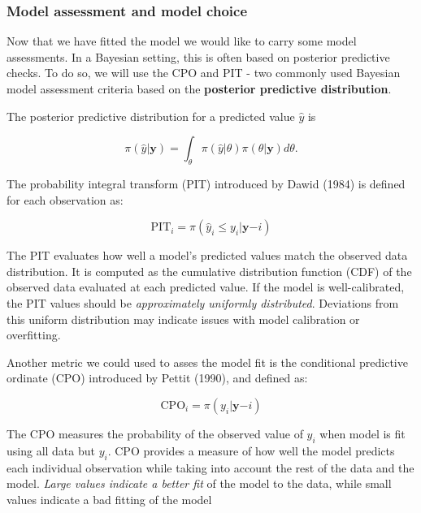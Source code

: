 \documentclass[
  letterpaper,
  DIV=11,
  numbers=noendperiod]{scrartcl}
\begin{document}
\subsubsection{Model assessment and model
choice}\label{model-assessment-and-model-choice}

Now that we have fitted the model we would like to carry some model
assessments. In a Bayesian setting, this is often based on posterior
predictive checks. To do so, we will use the CPO and PIT - two commonly
used Bayesian model assessment criteria based on the \textbf{posterior
predictive distribution}.

\begin{tcolorbox}[enhanced jigsaw, coltitle=black, breakable, colbacktitle=quarto-callout-note-color!10!white, bottomtitle=1mm, toprule=.15mm, colframe=quarto-callout-note-color-frame, rightrule=.15mm, title=\textcolor{quarto-callout-note-color}{\faInfo}\hspace{0.5em}{Posterior predictive model checking}, arc=.35mm, toptitle=1mm, opacityback=0, titlerule=0mm, left=2mm, bottomrule=.15mm, leftrule=.75mm, opacitybacktitle=0.6, colback=white]

The posterior predictive distribution for a predicted value \(\hat{y}\)
is

\[
\pi(\hat{y}|\mathbf{y}) = \int_\theta \pi(\hat{y}|\theta)\pi(\theta|\mathbf{y})d\theta.
\]

The probability integral transform (PIT) introduced by Dawid (1984) is
defined for each observation as:

\[
\mathrm{PIT}_i = \pi(\hat{y}_i \leq y_i |\mathbf{y}{-i})
\]

The PIT evaluates how well a model's predicted values match the observed
data distribution. It is computed as the cumulative distribution
function (CDF) of the observed data evaluated at each predicted value.
If the model is well-calibrated, the PIT values should be
\emph{approximately uniformly distributed}. Deviations from this uniform
distribution may indicate issues with model calibration or overfitting.

Another metric we could used to asses the model fit is the conditional
predictive ordinate (CPO) introduced by Pettit (1990), and deﬁned as:

\[
\text{CPO}_i = \pi(y_i| \mathbf{y}{-i})
\]

The CPO measures the probability of the observed value of \(y_i\) when
model is fit using all data but \(y_i\). CPO provides a measure of how
well the model predicts each individual observation while taking into
account the rest of the data and the model. \emph{Large values indicate
a better fit} of the model to the data, while small values indicate a
bad fitting of the model

\end{tcolorbox}
\end{document}

